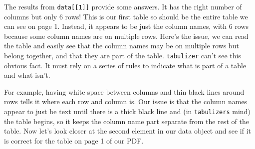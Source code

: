 \documentclass[
]{krantz}
\begin{document}
The results from \texttt{data{[}{[}1{]}{]}} provide some
answers. It has the right number of columns but only 6 rows!
This is our first table so should be the entire table we can
see on page 1. Instead, it appears to be just the column
names, with 6 rows because some column names are on multiple
rows. Here's the issue, we can read the table and easily see
that the column names may be on multiple rows but belong
together, and that they are part of the table.
\texttt{tabulizer} can't see this obvious fact. It must rely
on a series of rules to indicate what is part of a table and
what isn't.

For example, having white space between columns and thin
black lines around rows tells it where each row and column
is. Our issue is that the column names appear to just be
text until there is a thick black line and (in
\texttt{tabulizer\textquotesingle{}s} mind) the table
begins, so it keeps the column name part separate from the
rest of the table. Now let's look closer at the second
element in our data object and see if it is correct for the
table on page 1 of our PDF.
\end{document}
